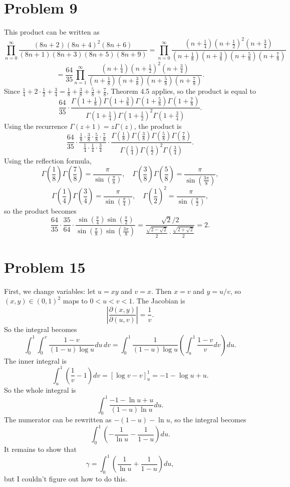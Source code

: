 \documentclass{article}
\newcommand{\bigp}[1]{\left(#1\right)}
\newcommand{\bigabs}[1]{\left|#1\right|}
\begin{document}
\section*{Problem 9}
This product can be written as
$$\prod_{n = 0}^\infty \frac{(8n + 2)(8n + 4)^2(8n + 6)}{(8n + 1)(8n + 3)(8n + 5)(8n + 9)} = \prod_{n = 0}^\infty \frac{(n + \frac{1}{4})(n + \frac{1}{2})^2(n + \frac{3}{4})}{(n + \frac{1}{8})(n + \frac 38)(n + \frac 58) (n + \frac 78)}$$
$$= \frac{64}{35}\prod_{n = 1}^\infty \frac{(n + \frac{1}{4})(n + \frac{1}{2})^2(n + \frac{3}{4})}{(n + \frac{1}{8})(n + \frac 38)(n + \frac 58) (n + \frac 78)}.$$
Since $\frac 14 + 2 \cdot \frac 12 + \frac 34 = \frac 18 + \frac 38 + \frac 58 + \frac 78$, Theorem 4.5 applies, so the product is equal to
$$\frac{64}{35}\cdot \frac{\Gamma(1 + \frac 18)\Gamma(1 + \frac 38)\Gamma(1 + \frac 58)\Gamma(1 + \frac 78)}{\Gamma(1 + \frac 14)\Gamma(1 + \frac 12)^2\Gamma(1 + \frac 34)}.$$
Using the recurrence $\Gamma(z + 1) = z\Gamma(z)$, the product is
$$\frac{64}{35} \cdot \frac{\frac 18 \cdot \frac 38 \cdot \frac 58 \cdot \frac 78}{\frac 14 \cdot \frac 14 \cdot \frac 34} \cdot \frac{\Gamma(\frac 18)\Gamma(\frac 38)\Gamma(\frac 58)\Gamma(\frac 78)}{\Gamma(\frac 14)\Gamma(\frac 12)^2\Gamma(\frac 34)}.$$
Using the reflection formula,
$$\Gamma\bigp{\frac 18}\Gamma\bigp{\frac 78} = \frac{\pi}{\sin(\frac\pi 8)}, \quad \Gamma\bigp{\frac 38}\Gamma\bigp{\frac 58} = \frac{\pi}{\sin(\frac{3\pi}{8})},$$
$$\Gamma\bigp{\frac 14}\Gamma\bigp{\frac 34} = \frac{\pi}{\sin(\frac\pi 4)}, \quad \Gamma\bigp{\frac 12}^2 = \frac{\pi}{\sin(\frac{\pi}{2})},$$
so the product becomes
$$\frac{64}{35} \cdot \frac{35}{64} \cdot \frac{\sin(\frac {\pi}{4})\sin(\frac {\pi}{2})}{\sin(\frac {\pi}{8})\sin(\frac {3\pi}{8})} = \frac{\sqrt{2}/2}{\frac{\sqrt{2 - \sqrt{2}}}{2} \cdot \frac{\sqrt{2 + \sqrt{2}}}{2}} = 2.$$

\section*{Problem 15}
First, we change variables: let $u = xy$ and $v = x$. Then $x = v$ and $y = u/v$, so $(x, y) \in (0, 1)^2$ maps to $0 < u < v < 1$. The Jacobian is
$$\bigabs{\frac{\partial(x, y)}{\partial(u, v)}} = \frac{1}{v}.$$
So the integral becomes
$$\int_0^1\int_0^v \frac{1 - v}{(1 - u)\log u} du\, dv = \int_0^1 \frac{1}{(1 - u)\log u} \bigp{\int_u^1 \frac{1 - v}{v}dv}du.$$
The inner integral is
$$\int_u^1 \bigp{\frac{1}{v} - 1}dv = [\log v - v]_u^1 = -1 - \log u + u.$$
So the whole integral is
$$\int_0^1 \frac{-1 - \ln u + u}{(1 - u)\ln u} du.$$
The numerator can be rewritten as $-(1 - u) - \ln u$, so the integral becomes
$$\int_0^1 \bigp{-\frac{1}{\ln u} - \frac{1}{1 - u}}du.$$
It remains to show that
$$\gamma = \int_0^1 \bigp{\frac{1}{\ln u} + \frac{1}{1 - u}}du,$$
but I couldn't figure out how to do this.
\end{document}
